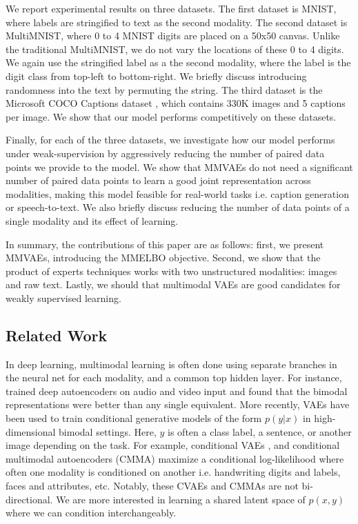 \documentclass{article}
\begin{document}
We report experimental results on three datasets. The first dataset is MNIST, where labels are stringified to text as the second modality. The second dataset is MultiMNIST, where 0 to 4 MNIST digits are placed on a 50x50 canvas. Unlike the traditional MultiMNIST, we do not vary the locations of these 0 to 4 digits. We again use the stringified label as a the second modality, where the label is the digit class from top-left to bottom-right. We briefly discuss introducing randomness into the text by permuting the string. The third dataset is the Microsoft COCO Captions dataset \cite{chen2015microsoft}, which contains 330K images and 5 captions per image. We show that our model performs competitively on these datasets.

Finally, for each of the three datasets, we investigate how our model performs under weak-supervision by aggressively reducing the number of paired data points we provide to the model. We show that MMVAEs do not need a significant number of paired data points to learn a good joint representation across modalities, making this model feasible for real-world tasks i.e. caption generation or speech-to-text. We also briefly discuss reducing the number of data points of a single modality and its effect of learning.

In summary, the contributions of this paper are as follows: first, we present MMVAEs, introducing the MMELBO objective. Second, we show that the product of experts techniques works with two unstructured modalities: images and raw text. Lastly, we should that multimodal VAEs are good candidates for weakly supervised learning.

\subsection{Related Work}
In deep learning, multimodal learning is often done using separate branches in the neural net for each modality, and a common top hidden layer. For instance, \citet{ngiam2011multimodal} trained deep autoencoders on audio and video input and found that the bimodal representations were better than any single equivalent. More recently, VAEs \cite{kingma2013auto, kingma2014semi} have been used to train conditional generative models of the form $p(y | x)$ in high-dimensional bimodal settings. Here, $y$ is often a class label, a sentence, or another image depending on the task. For example, conditional VAEs \cite{sohn2015learning}, and conditional multimodal autoencoders (CMMA) \cite{pandey2017variational} maximize a conditional log-likelihood where often one modality is conditioned on another i.e. handwriting digits and labels, faces and attributes, etc. Notably, these CVAEs and CMMAs are not bi-directional. We are more interested in learning a shared latent space of $p(x, y)$ where we can condition interchangeably. 
\end{document}
